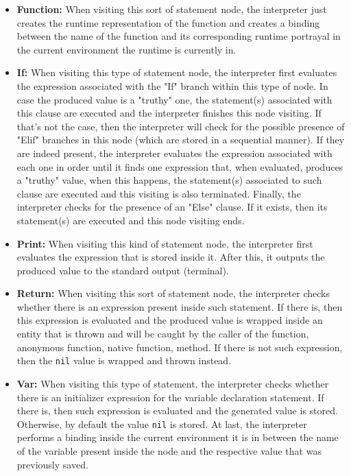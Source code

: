 \begin{itemize}
    \item \textbf{Function:} When visiting this sort of statement node, the interpreter just creates the runtime representation of the function and creates a binding between the name of the function and its corresponding runtime portrayal in the current environment the runtime is currently in.
    
    \item \textbf{If:} When visiting this type of statement node, the interpreter first evaluates the expression associated with the "If" branch within this type of node. In case the produced value is a "truthy" one, the statement(s) associated with this clause are executed and the interpreter finishes this node visiting. If that's not the case, then the interpreter will check for the possible presence of "Elif" branches in this node (which are stored in a sequential manner). If they are indeed present, the interpreter evaluates the expression associated with each one in order until it finds one expression that, when evaluated, produces a "truthy" value, when this happens, the statement(s) associated to such clause are executed and this visiting is also terminated. Finally, the interpreter checks for the presence of an "Else" clause. If it exists, then its statement(s) are executed and this node visiting ends. 
    
    \item \textbf{Print:} When visiting this kind of statement node, the interpreter first evaluates the expression that is stored inside it. After this, it outputs the produced value to the standard output (terminal).
    
    \item \textbf{Return:} When visiting this sort of statement node, the interpreter checks whether there is an expression present inside such statement. If there is, then this expression is evaluated and the produced value is wrapped inside an entity that is thrown and will be caught by the caller of the function, anonymous function, native function, method. If there is not such expression, then the \texttt{nil} value is wrapped and thrown instead.
    
    \item \textbf{Var:} When visiting this type of statement, the interpreter checks whether there is an initializer expression for the variable declaration statement. If there is, then such expression is evaluated and the generated value is stored. Otherwise, by default the value \texttt{nil} is stored. At last, the interpreter performs a binding inside the current environment it is in between the name of the variable present inside the node and the respective value that was previously saved.
    

\end{itemize}

